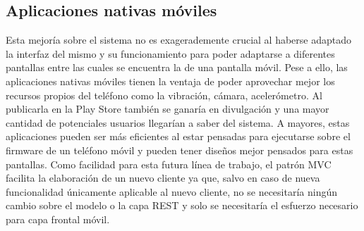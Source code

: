 \documentclass[12pt, a4paper, twoside]{book}
\begin{document}
	\subsection{Aplicaciones nativas móviles}
	Esta mejoría sobre el sistema no es exagerademente crucial al haberse adaptado la interfaz del mismo y su funcionamiento para poder adaptarse a diferentes pantallas entre las cuales se encuentra la de una pantalla móvil.
	Pese a ello, las aplicaciones nativas móviles tienen la ventaja de poder aprovechar mejor los recursos propios del teléfono como la vibración, cámara, acelerómetro. Al publicarla en la Play Store también se ganaría en divulgación y una mayor cantidad de potenciales usuarios llegarían a saber del sistema.
	A mayores, estas aplicaciones pueden ser más eficientes al estar pensadas para ejecutarse sobre el firmware de un teléfono móvil y pueden tener diseños mejor pensados para estas pantallas.
	Como facilidad para esta futura línea de trabajo, el patrón MVC facilita la elaboración de un nuevo cliente ya que, salvo en caso de nueva funcionalidad únicamente aplicable al nuevo cliente, no se necesitaría ningún cambio sobre el modelo o la capa REST y solo se necesitaría el esfuerzo necesario para capa frontal móvil.
\end{document}
